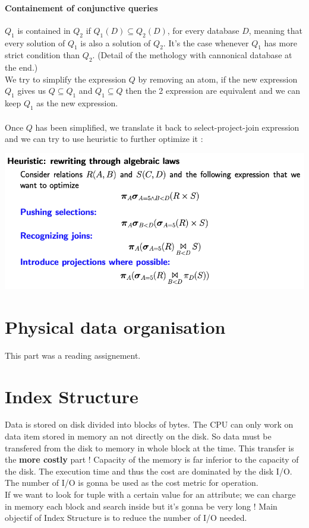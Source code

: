 \documentclass[12pt,a4paper]{article}
\begin{document}
\paragraph{Containement of conjunctive queries}
$Q_1$ is contained in $Q_2$ if $Q_1(D) \subseteq Q_2(D)$, for every database $D$, meaning that every solution of $Q_1$ is also a solution of $Q_2$. It's the case whenever $Q_1$ has more strict condition than $Q_2$. (Detail of the methology with cannonical database at the end.)\\
We try to simplify the expression $Q$ by removing an atom, if the new expression $Q_1$ gives us $Q \subseteq Q_1$ and $Q_1 \subseteq Q$ then the 2 expression are equivalent and we can keep $Q_1$ as the new expression.\\
\\
Once $Q$ has been simplified, we translate it back to select-project-join expression and we can try to use heuristic to further optimize it :
\begin{center}
\includegraphics[scale=0.4]{img/img22.png}
\end{center}

\section{Physical data organisation}
This part was a reading assignement.

\section{Index Structure}
Data is stored on disk divided into blocks of bytes. The CPU can only work on data item stored in memory an not directly on the disk. So data must be transfered from the disk to memory in whole block at the time. This transfer is the \textbf{more costly} part ! Capacity of the memory is far inferior to the capacity of the disk. The execution time and thus the cost are dominated by the disk I/O. The number of I/O is gonna be used as the cost metric for operation.\\
If we want to look for tuple with a certain value for an attribute; we can charge in memory each block and search inside but it's gonna be very long ! Main objectif of Index Structure is to reduce the number of I/O needed.
\end{document}
